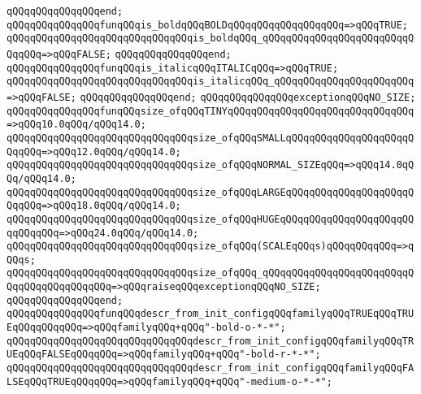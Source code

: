 \verb|qQQqqQQqqQQqqQQqend;|\newline
\newline
\verb|qQQqqQQqqQQqqQQqfunqQQqis_boldqQQqBOLDqQQqqQQqqQQqqQQqqQQq=>qQQqTRUE;|\newline
\verb|qQQqqQQqqQQqqQQqqQQqqQQqqQQqqQQqis_boldqQQq_qQQqqQQqqQQqqQQqqQQqqQQqqQQqqQQq=>qQQqFALSE;|\newline
\verb|qQQqqQQqqQQqqQQqend;|\newline
\newline
\verb|qQQqqQQqqQQqqQQqfunqQQqis_italicqQQqITALICqQQq=>qQQqTRUE;|\newline
\verb|qQQqqQQqqQQqqQQqqQQqqQQqqQQqqQQqis_italicqQQq_qQQqqQQqqQQqqQQqqQQqqQQq=>qQQqFALSE;|\newline
\verb|qQQqqQQqqQQqqQQqend;|\newline
\newline
\verb|qQQqqQQqqQQqqQQqexceptionqQQqNO_SIZE;|\newline
\newline
\verb|qQQqqQQqqQQqqQQqfunqQQqsize_ofqQQqTINYqQQqqQQqqQQqqQQqqQQqqQQqqQQqqQQq=>qQQq10.0qQQq/qQQq14.0;|\newline
\verb|qQQqqQQqqQQqqQQqqQQqqQQqqQQqqQQqsize_ofqQQqSMALLqQQqqQQqqQQqqQQqqQQqqQQqqQQq=>qQQq12.0qQQq/qQQq14.0;|\newline
\verb|qQQqqQQqqQQqqQQqqQQqqQQqqQQqqQQqsize_ofqQQqNORMAL_SIZEqQQq=>qQQq14.0qQQq/qQQq14.0;|\newline
\verb|qQQqqQQqqQQqqQQqqQQqqQQqqQQqqQQqsize_ofqQQqLARGEqQQqqQQqqQQqqQQqqQQqqQQqqQQq=>qQQq18.0qQQq/qQQq14.0;|\newline
\verb|qQQqqQQqqQQqqQQqqQQqqQQqqQQqqQQqsize_ofqQQqHUGEqQQqqQQqqQQqqQQqqQQqqQQqqQQqqQQq=>qQQq24.0qQQq/qQQq14.0;|\newline
\verb|qQQqqQQqqQQqqQQqqQQqqQQqqQQqqQQqsize_ofqQQq(SCALEqQQqs)qQQqqQQqqQQq=>qQQqs;|\newline
\verb|qQQqqQQqqQQqqQQqqQQqqQQqqQQqqQQqsize_ofqQQq_qQQqqQQqqQQqqQQqqQQqqQQqqQQqqQQqqQQqqQQqqQQq=>qQQqraiseqQQqexceptionqQQqNO_SIZE;|\newline
\verb|qQQqqQQqqQQqqQQqend;|\newline
\newline
\verb|qQQqqQQqqQQqqQQqfunqQQqdescr_from_init_configqQQqfamilyqQQqTRUEqQQqTRUEqQQqqQQqqQQq=>qQQqfamilyqQQq+qQQq"-bold-o-*-*";|\newline
\verb|qQQqqQQqqQQqqQQqqQQqqQQqqQQqqQQqdescr_from_init_configqQQqfamilyqQQqTRUEqQQqFALSEqQQqqQQq=>qQQqfamilyqQQq+qQQq"-bold-r-*-*";|\newline
\verb|qQQqqQQqqQQqqQQqqQQqqQQqqQQqqQQqdescr_from_init_configqQQqfamilyqQQqFALSEqQQqTRUEqQQqqQQq=>qQQqfamilyqQQq+qQQq"-medium-o-*-*";|\newline
